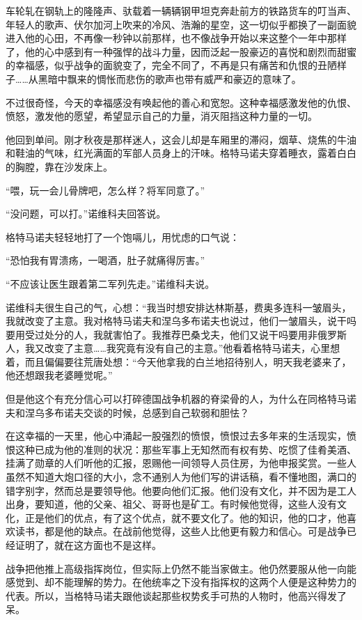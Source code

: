 车轮轧在钢轨上的隆隆声、驮载着一辆辆钢甲坦克奔赴前方的铁路货车的叮当声、年轻人的歌声、伏尔加河上吹来的冷风、浩瀚的星空，这一切似乎都换了一副面貌进入他的心田，不再像一秒钟以前那样，也不像战争开始以来这整个一年中那样了，他的心中感到有一种强悍的战斗力量，因而泛起一股豪迈的喜悦和剧烈而甜蜜的幸福感，似乎战争的面貌变了，完全不同了，不再是只有痛苦和仇恨的丑陋样子……从黑暗中飘来的惆怅而悲伤的歌声也带有威严和豪迈的意味了。

不过很奇怪，今天的幸福感没有唤起他的善心和宽恕。这种幸福感激发他的仇恨、愤怒，激发他的愿望，希望显示自己的力量，消灭阻挡这种力量的一切。

他回到单间。刚才秋夜是那样迷人，这会儿却是车厢里的滞闷，烟草、烧焦的牛油和鞋油的气味，红光满面的军部人员身上的汗味。格特马诺夫穿着睡衣，露着白白的胸膛，靠在沙发床上。

“喂，玩一会儿骨牌吧，怎么样？将军同意了。”

“没问题，可以打。”诺维科夫回答说。

格特马诺夫轻轻地打了一个饱嗝儿，用忧虑的口气说：

“恐怕我有胃溃疡，一喝酒，肚子就痛得厉害。”

“不应该让医生跟着第二军列先走。”诺维科夫说。

诺维科夫很生自己的气，心想：“我当时想安排达林斯基，费奥多连科一皱眉头，我就改变了主意。我对格特马诺夫和涅乌多布诺夫也说过，他们一皱眉头，说干吗要用受过处分的人，我就害怕了。我推荐巴桑戈夫，他们又说干吗要用非俄罗斯人，我又改变了主意……我究竟有没有自己的主意。”他看着格特马诺夫，心里想着，而且偏偏要往荒唐处想：“今天他拿我的白兰地招待别人，明天我老婆来了，他还想跟我老婆睡觉呢。”

但是他这个有充分信心可以打碎德国战争机器的脊梁骨的人，为什么在同格特马诺夫和涅乌多布诺夫交谈的时候，总感到自己软弱和胆怯？

在这幸福的一天里，他心中涌起一股强烈的愤恨，愤恨过去多年来的生活现实，愤恨这种已成为他的准则的状况：那些军事上无知然而有权有势、吃惯了佳肴美酒、挂满了勋章的人们听他的汇报，恩赐他一间领导人员住房，为他申报奖赏。一些人虽然不知道大炮口径的大小，念不通别人为他们写的讲话稿，看不懂地图，满口的错字别字，然而总是要领导他。他要向他们汇报。他们没有文化，并不因为是工人出身，要知道，他的父亲、祖父、哥哥也是矿工。有时候他觉得，这些人没有文化，正是他们的优点，有了这个优点，就不要文化了。他的知识，他的口才，他喜欢读书，都是他的缺点。在战前他觉得，这些人比他更有毅力和信心。可是战争已经证明了，就在这方面也不是这样。

战争把他推上高级指挥岗位，但实际上仍然不能当家做主。他仍然要服从他一向能感觉到、却不能理解的势力。在他统率之下没有指挥权的这两个人便是这种势力的代表。所以，当格特马诺夫跟他谈起那些权势炙手可热的人物时，他高兴得发了呆。

